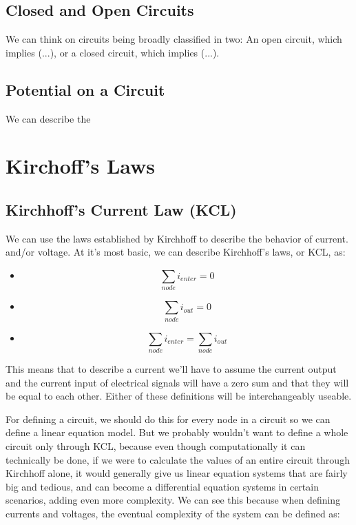 \documentclass[11pt,fleqn]{book} %
\begin{document}
\section{Closed and Open Circuits}

We can think on circuits being broadly classified in two: An open circuit, which implies (...), or a closed circuit, which
implies (...).
\section{Potential on a Circuit}


We can describe the 

\chapter{Kirchoff's Laws}

\section{Kirchhoff's Current Law (KCL)}

We can use the laws established by Kirchhoff to describe the behavior of current. 
and/or voltage. At it's most basic, we can describe Kirchhoff's laws, or KCL, as:

\begin{itemize}
    \item $$\sum_{node} i_{enter} = 0$$
    \item $$\sum_{node} i_{out} = 0$$
    \item $$ \sum_{node} i_{enter} = \sum_{node} i_{out} $$
\end{itemize}

This means that to describe a current we'll 
have to assume the current output and the current input of
electrical signals will have a zero sum and that they will be equal to
each other. Either of these definitions will be interchangeably useable. 

For defining a circuit, we should do this for every node in a circuit so we can
define a linear equation model. But we probably wouldn't want to define a whole circuit only 
through KCL, because even though computationally it can technically be done, if we were to calculate
the values of an entire circuit through Kirchhoff alone, it would generally give us 
linear equation systems that are fairly big and tedious, and can become a differential equation systems
in certain scenarios, adding even more complexity. We can see this because when
defining currents and voltages, the eventual complexity of the system can be defined as:
\end{document}
